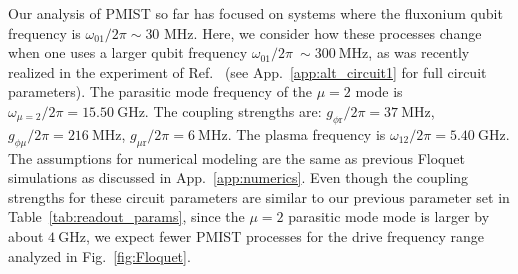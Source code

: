 \documentclass[%
reprint,
superscriptaddress,
 amsmath,amssymb,
 aps,
 prx,
longbibliography,
floatfix,
]{revtex4-2}
\begin{document}
Our analysis of PMIST so far has focused on systems where the fluxonium qubit frequency is $\omega_{01} / 2 \pi \sim 30$ MHz.  
Here, we consider how these processes change when one uses a larger qubit frequency $\omega_{01}/2\pi~\sim 300 \ \mathrm{MHz}$, as was recently realized in the experiment of Ref.~\cite{ding_high-fidelity_2023} (see App.~\ref{app:alt_circuit1} for full circuit parameters). 
The parasitic mode frequency of the $\mu=2$ mode is $\omega_{\mu=2}/2\pi=15.50 \ \mathrm{GHz}$. The coupling strengths are:  $g_{\phi \textrm{r}}/2\pi=37 \ \mathrm{MHz}$, $g_{\phi\mu}/2\pi=216 \ \mathrm{MHz}$, $g_{\mu \textrm{r}}/2\pi=6 \ \mathrm{MHz}$. The plasma frequency is $\omega_{12}/2\pi=5.40 \ \mathrm{GHz}$. %
The assumptions for numerical modeling are the same as previous Floquet simulations as discussed in App.~\ref{app:numerics}. Even though the coupling strengths for these circuit parameters are similar to our previous parameter set in Table~\ref{tab:readout_params}, since the $\mu=2$ parasitic mode mode is larger by about $4 \ \mathrm{GHz}$, we expect fewer PMIST processes for the drive frequency range analyzed in Fig.~\ref{fig:Floquet}. 
\end{document}
